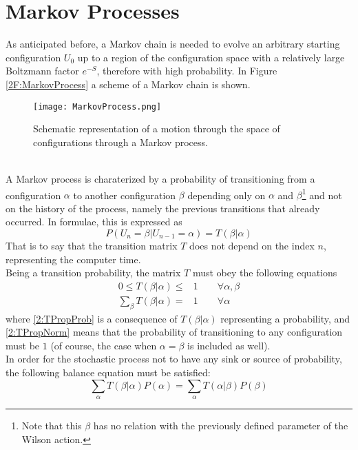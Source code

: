 \section{Markov Processes}
As anticipated before, a Markov chain is needed to evolve an arbitrary starting configuration $U_0$ up to a region of the configuration space with a relatively large Boltzmann factor $e^{-S}$, therefore with high probability.
In Figure \eqref{2F:MarkovProcess} a scheme of a Markov chain is shown.
\begin{figure}[!htbp]
    \centering
    \texttt{[image: MarkovProcess.png]}
    \caption{Schematic representation of a motion through the space of configurations through a Markov process.}
    \label{2F:MarkovProcess}
\end{figure}\\
A Markov process is charaterized by a probability of transitioning from a configuration $\alpha$ to another configuration $\beta$ depending only on $\alpha$ and $\beta$\footnote{Note that this $\beta$ has no relation with the previously defined parameter of the Wilson action.} and not on the history of the process, namely the previous transitions that already occurred.
In formulae, this is expressed as
\begin{equation}
    P(U_n=\beta|U_{n-1}=\alpha) = T(\beta|\alpha) \label{2:TransMatrix}
\end{equation}
That is to say that the transition matrix $T$ does not depend on the index $n$, representing the computer time.\\
Being a transition probability, the matrix $T$ must obey the following equations
\begin{align}
    0 \leq T(\beta|\alpha) \leq& 1 \qquad \forall \alpha,\beta \label{2:TPropProb} \\
    \sum_{\beta}T(\beta|\alpha) =& 1 \qquad \forall \alpha \label{2:TPropNorm}
\end{align}
where \eqref{2:TPropProb} is a consequence of $T(\beta|\alpha)$ representing a probability, and \eqref{2:TPropNorm} means that the probability of transitioning to any configuration must be $1$ (of course, the case when $\alpha=\beta$ is included as well).\\
In order for the stochastic process not to have any sink or source of probability, the following balance equation must be satisfied:
\begin{equation}
    \sum_\alpha T(\beta|\alpha)P(\alpha) = \sum_\alpha T(\alpha|\beta)P(\beta) \label{2:BalanceEq}
\end{equation}
